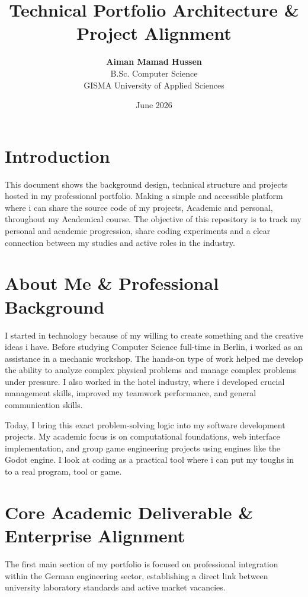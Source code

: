 \documentclass[11pt,a4paper]{article}
\title{\textbf{Technical Portfolio Architecture \& Project Alignment}}
\author{\textbf{Aiman Mamad Hussen} \\ B.Sc. Computer Science \\ GISMA University of Applied Sciences}
\date{June 2026}
\begin{document}
\maketitle

\section{Introduction}
This document shows the background design, technical structure and projects hosted in my professional portfolio. Making a simple and accessible platform where i can share the source code of my projects, Academic and personal, throughout my Academical course. The objective of this repository is to track my  personal and academic progression, share coding experiments and a clear connection between my studies and active roles in the industry. 

\section{About Me \& Professional Background}
I started in technology because of my willing to create something and the creative ideas i have. Before studying Computer Science full-time in Berlin, i worked as an assistance in a mechanic workshop. The hands-on type of work helped me develop the ability to analyze complex physical problems and manage complex problems under pressure. I also worked in the hotel industry, where i developed crucial management skills, improved my teamwork performance, and general communication skills.

Today, I bring this exact problem-solving logic into my software development projects. My academic focus is on computational foundations, web interface implementation, and group game engineering projects using engines like the Godot engine. I look at coding as a practical tool where i can put my toughs in to a real program, tool or game.

\section{Core Academic Deliverable \& Enterprise Alignment}
The first main section of my portfolio is focused on professional integration within the German engineering sector, establishing a direct link between university laboratory standards and active market vacancies.
\end{document}
